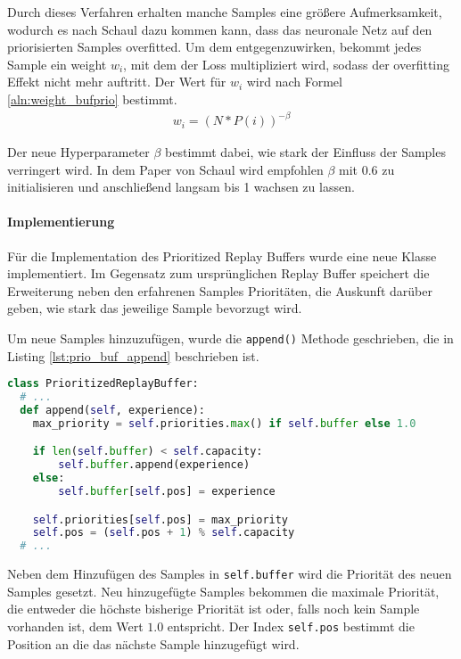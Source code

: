 \documentclass[11pt]{scrartcl}
\begin{document}
Durch dieses Verfahren erhalten manche Samples eine größere Aufmerksamkeit, wodurch es
nach Schaul \cite{schaul2015prioritized} dazu kommen kann, dass das neuronale Netz auf den
priorisierten Samples overfitted. Um dem entgegenzuwirken, bekommt jedes Sample ein
weight $w_i$, mit dem der Loss multipliziert wird, sodass der overfitting Effekt nicht
mehr auftritt. Der Wert für $w_i$ wird nach Formel \ref{aln:weight_bufprio} bestimmt.
\begin{align}
  w_i = \left(N * P(i)\right)^{-\beta}
\label{aln:weight_bufprio}
\end{align}

Der neue Hyperparameter $\beta$ bestimmt dabei, wie stark der Einfluss der Samples
verringert wird. In dem Paper von Schaul wird empfohlen $\beta$ mit 0.6 zu initialisieren
und anschließend langsam bis 1 wachsen zu lassen.

\paragraph*{Implementierung}
\noindent
\newline
Für die Implementation des Prioritized Replay Buffers wurde eine neue Klasse
implementiert. Im Gegensatz zum ursprünglichen Replay Buffer speichert die Erweiterung
neben den erfahrenen Samples Prioritäten, die Auskunft darüber geben, wie stark das
jeweilige Sample bevorzugt wird.

Um neue Samples hinzuzufügen, wurde die \lstinline!append()! Methode geschrieben, die in
Listing \ref{lst:prio_buf_append} beschrieben ist.
\newpage

\begin{lstlisting}[language=Python, caption=append()-Funktion des PrioritizedReplayBuffers,
label=lst:prio_buf_append]
class PrioritizedReplayBuffer:
  # ...
  def append(self, experience):
    max_priority = self.priorities.max() if self.buffer else 1.0

    if len(self.buffer) < self.capacity:
        self.buffer.append(experience)
    else:
        self.buffer[self.pos] = experience

    self.priorities[self.pos] = max_priority
    self.pos = (self.pos + 1) % self.capacity
  # ...
\end{lstlisting}
\noindent
Neben dem Hinzufügen des Samples in \lstinline!self.buffer! wird die Priorität des neuen
Samples gesetzt. Neu hinzugefügte Samples bekommen die maximale Priorität, die entweder
die höchste bisherige Priorität ist oder, falls noch kein Sample vorhanden ist, dem Wert
$1.0$ entspricht. Der Index \lstinline!self.pos! bestimmt die Position an die das nächste
Sample hinzugefügt wird.
\end{document}
